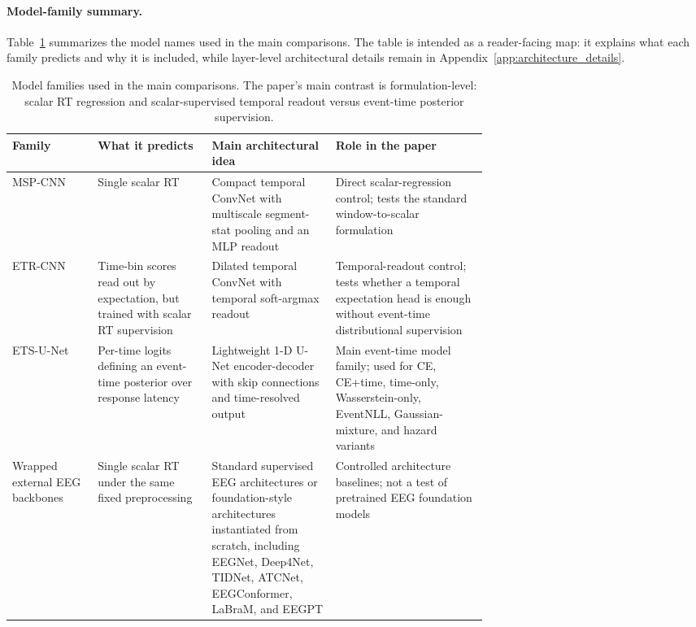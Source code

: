 \documentclass[12pt]{article}
\begin{document}
\paragraph{Model-family summary.}
Table~\ref{tab:model_family_summary} summarizes the model names used in the main comparisons. The table is intended as a reader-facing map: it explains what each family predicts and why it is included, while layer-level architectural details remain in Appendix~\ref{app:architecture_details}.

\begin{table}[!t]
\centering
\caption{Model families used in the main comparisons. The paper's main contrast is formulation-level: scalar RT regression and scalar-supervised temporal readout versus event-time posterior supervision.}
\label{tab:model_family_summary}
\scriptsize
\setlength{\tabcolsep}{3pt}
\renewcommand{\arraystretch}{1.15}
\begin{tabularx}{\linewidth}{@{} >{\RaggedRight\arraybackslash}p{0.18\linewidth} >{\RaggedRight\arraybackslash}p{0.24\linewidth} >{\RaggedRight\arraybackslash}p{0.26\linewidth} X @{}}
\toprule
\textbf{Family} & \textbf{What it predicts} & \textbf{Main architectural idea} & \textbf{Role in the paper} \\
\midrule
MSP-CNN & Single scalar RT & Compact temporal ConvNet with multiscale segment-stat pooling and an MLP readout & Direct scalar-regression control; tests the standard window-to-scalar formulation \\
ETR-CNN & Time-bin scores read out by expectation, but trained with scalar RT supervision & Dilated temporal ConvNet with temporal soft-argmax readout & Temporal-readout control; tests whether a temporal expectation head is enough without event-time distributional supervision \\
ETS-U-Net & Per-time logits defining an event-time posterior over response latency & Lightweight 1-D U-Net encoder-decoder with skip connections and time-resolved output & Main event-time model family; used for CE, CE+time, time-only, Wasserstein-only, EventNLL, Gaussian-mixture, and hazard variants \\
Wrapped external EEG backbones & Single scalar RT under the same fixed preprocessing & Standard supervised EEG architectures or foundation-style architectures instantiated from scratch, including EEGNet, Deep4Net, TIDNet, ATCNet, EEGConformer, LaBraM, and EEGPT & Controlled architecture baselines; not a test of pretrained EEG foundation models \\
\bottomrule
\end{tabularx}
\end{table}
\end{document}
